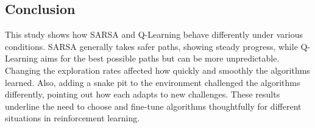 \documentclass[12pt]{article}
\begin{document}
\subsection{Conclusion}

This study shows how SARSA and Q-Learning behave differently under various conditions. SARSA generally takes safer paths, showing steady progress, while Q-Learning aims for the best possible paths but can be more unpredictable. Changing the exploration rates affected how quickly and smoothly the algorithms learned. Also, adding a snake pit to the environment challenged the algorithms differently, pointing out how each adapts to new challenges. These results underline the need to choose and fine-tune algorithms thoughtfully for different situations in reinforcement learning.
\end{document}
